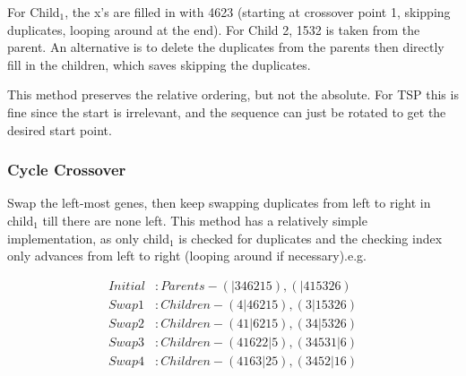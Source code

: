 For Child$_1$, the x's are filled in with 4623 (starting at crossover point 1, skipping duplicates, looping around at the end). For Child 2, 1532 is taken from the parent. An alternative is to delete the duplicates from the parents then directly fill in the children, which saves skipping the duplicates.

This method preserves the relative ordering, but not the absolute. For TSP this is fine since the start is irrelevant, and the sequence can just be rotated to get the desired start point.
\newpage
\subsubsection{Cycle Crossover}
Swap the left-most genes, then keep swapping duplicates from left to right in child$_1$ till there are none left. This method has a relatively simple implementation, as only child$_1$ is checked for duplicates and the checking index only advances from left to right (looping around if necessary).e.g.

\begin{align}
    Initial &: Parents - (|346215), (|415326) \nonumber \\ 
    Swap 1 &: Children - (4|46215), (3|15326) \nonumber \\
    Swap 2 &: Children - (41|6215), (34|5326) \nonumber \\
    Swap 3 &: Children - (41622|5), (34531|6) \nonumber \\
    Swap 4 &: Children - (4163|25), (3452|16) \nonumber 
\end{align}

